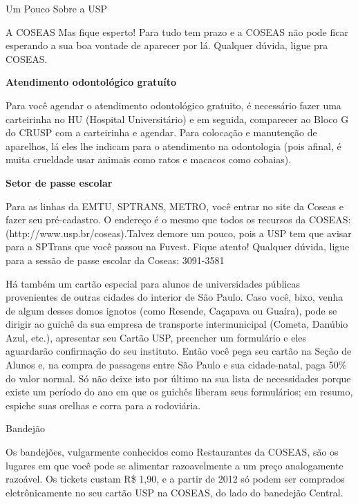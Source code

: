 \begin{secao}{Um Pouco Sobre a USP}
\begin{subsecao}{A COSEAS}
Mas fique esperto! Para tudo tem prazo e a COSEAS não pode ficar esperando a sua
boa vontade de aparecer por lá. Qualquer dúvida, ligue pra COSEAS.

{\bf Atendimento odontológico gratuíto}

Para você agendar o atendimento odontológico gratuito, é necessário fazer uma
carteirinha no HU (Hospital Universitário) e em seguida, comparecer ao Bloco G
do CRUSP com a carteirinha e agendar. Para colocação e manutenção de aparelhos,
lá eles lhe indicam para o atendimento na odontologia (pois afinal, é muita
crueldade usar animais como ratos e macacos como cobaias). 

{\bf Setor de passe escolar}

Para as linhas da EMTU, SPTRANS, METRO, você entrar no site da Coseas e fazer
seu pré-cadastro. O endereço é o mesmo que todos os recursos da
COSEAS: (http://www.usp.br/coseas).Talvez demore um pouco, pois a USP tem que
avisar para a SPTrans que você passou na Fuvest. Fique atento! Qualquer dúvida,
ligue para a sessão de passe escolar da Coseas: 3091-3581 

Há também um cartão especial para alunos de universidades públicas provenientes
de outras cidades do interior de São Paulo. Caso você, bixo, venha de algum desses domos ignotos
(como Resende, Caçapava ou Guaíra), pode se dirigir ao guichê da sua empresa de
transporte intermunicipal (Cometa, Danúbio Azul, etc.), apresentar seu Cartão USP,
preencher um formulário e eles aguardarão confirmação do seu instituto. Então
você pega seu cartão na Seção de Alunos e, na compra de passagens entre São Paulo
e sua cidade-natal, paga 50\% do valor normal. Só não deixe isto por último na
sua lista de necessidades porque existe um período do ano em que os guichês
liberam seus formulários; em resumo, espiche suas orelhas e corra para a rodoviária.

\end{subsecao}

\pagebreak
{} %

\begin{subsecao}{Bandejão}

Os bandejões, vulgarmente conhecidos como Restaurantes da COSEAS, são os lugares
em que você pode se alimentar razoavelmente a um preço analogamente razoável.
Os tickets custam R\$ 1,90, e a partir de 2012 só podem ser comprados eletrônicamente
no seu cartão USP na COSEAS, do lado do banedejão Central.


\end{subsecao}
\end{secao}
